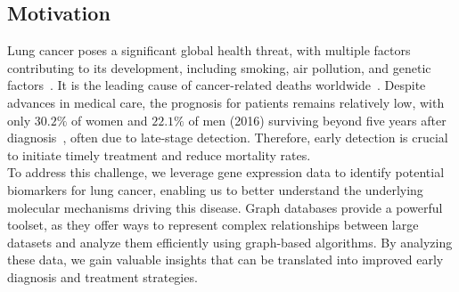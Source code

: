 \subsection{Motivation} \label{subsec:motivation}

Lung cancer poses a significant global health threat, with multiple factors contributing to its development,
including smoking, air pollution, and genetic factors~\cite{ferlay2024global}.
It is the leading cause of cancer-related deaths worldwide~\cite{ferlay2024global}.
Despite advances in medical care, the prognosis for patients remains relatively low,
with only $30.2\%$ of women and $22.1\%$ of men (2016) surviving beyond five years after diagnosis~\cite{seer2024explorer},
often due to late-stage detection.
Therefore, early detection is crucial to initiate timely treatment and reduce mortality rates.
\\

To address this challenge, we leverage gene expression data to identify potential biomarkers for lung cancer,
enabling us to better understand the underlying molecular mechanisms driving this disease.
Graph databases provide a powerful toolset, as they offer ways to represent complex relationships
between large datasets and analyze them efficiently using graph-based algorithms.
By analyzing these data, we gain valuable insights that can be translated into improved early diagnosis and treatment strategies.
